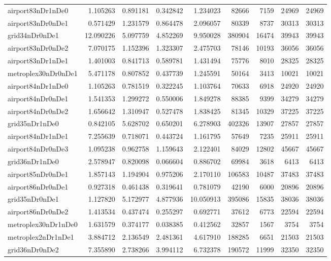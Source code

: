 \begin{longtable}{|l|r|r|r|r|r|r|r|r|}
airport83nDr1nDe0 & 1.105263 & 0.891181 & 0.342842 & 1.234023 & 82666 & 7159 & 24969 & 24969 \\
airport83nDr0nDe1 & 0.571429 & 1.231579 & 0.864478 & 2.096057 & 80339 & 8737 & 30313 & 30313 \\
grid34nDr0nDe1 & 12.090226 & 5.097759 & 4.852269 & 9.950028 & 380904 & 16474 & 39943 & 39943 \\
airport83nDr0nDe2 & 7.070175 & 1.152396 & 1.323307 & 2.475703 & 78146 & 10193 & 36056 & 36056 \\
airport83nDr1nDe1 & 1.401003 & 0.841713 & 0.589781 & 1.431494 & 75776 & 8010 & 28325 & 28325 \\
metroplex30nDr0nDe1 & 5.471178 & 0.807852 & 0.437739 & 1.245591 & 50164 & 3413 & 10021 & 10021 \\
airport84nDr1nDe0 & 1.105263 & 0.781519 & 0.322245 & 1.103764 & 70633 & 6918 & 24920 & 24920 \\
airport84nDr0nDe1 & 1.541353 & 1.299272 & 0.550006 & 1.849278 & 88385 & 9399 & 34279 & 34279 \\
airport84nDr0nDe2 & 1.656642 & 1.310947 & 0.527478 & 1.838425 & 81345 & 10329 & 37225 & 37225 \\
grid35nDr1nDe0 & 0.842105 & 5.628702 & 0.650201 & 6.278903 & 402326 & 13907 & 27857 & 27857 \\
airport84nDr1nDe1 & 7.255639 & 0.718071 & 0.443724 & 1.161795 & 57649 & 7235 & 25911 & 25911 \\
airport84nDr0nDe3 & 1.095238 & 0.962758 & 1.159643 & 2.122401 & 84029 & 12802 & 45667 & 45667 \\
grid36nDr1nDe0 & 2.578947 & 0.820098 & 0.066604 & 0.886702 & 69984 & 3618 & 6413 & 6413 \\
airport85nDr0nDe1 & 1.857143 & 1.194904 & 0.975206 & 2.170110 & 106583 & 10487 & 37483 & 37483 \\
airport86nDr0nDe1 & 0.927318 & 0.461438 & 0.319641 & 0.781079 & 42190 & 6000 & 20896 & 20896 \\
grid35nDr0nDe1 & 1.127820 & 5.172977 & 4.877936 & 10.050913 & 395086 & 15835 & 38036 & 38036 \\
airport86nDr0nDe2 & 1.413534 & 0.437474 & 0.255297 & 0.692771 & 37612 & 6773 & 22594 & 22594 \\
metroplex30nDr1nDe0 & 1.631579 & 0.374177 & 0.038385 & 0.412562 & 32857 & 1567 & 3754 & 3754 \\
metroplex2nDr1nDe1 & 3.884712 & 2.136549 & 2.481361 & 4.617910 & 188285 & 6651 & 21503 & 21503 \\
grid36nDr0nDe2 & 7.355890 & 2.738266 & 3.994112 & 6.732378 & 190572 & 11999 & 32350 & 32350 \\

\end{longtable}

